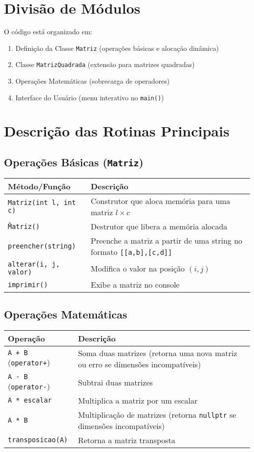 \documentclass{article}
\begin{document}
\section{Divisão de Módulos}
O código está organizado em:
\begin{enumerate}
    \item Definição da Classe \texttt{Matriz} (operações básicas e alocação dinâmica)
    \item Classe \texttt{MatrizQuadrada} (extensão para matrizes quadradas)
    \item Operações Matemáticas (sobrecarga de operadores)
    \item Interface do Usuário (menu interativo no \texttt{main()})
\end{enumerate}

\section{Descrição das Rotinas Principais}

\subsection{Operações Básicas (\texttt{Matriz})}
\begin{tabular}{|l|p{10cm}|}
\hline
\textbf{Método/Função} & \textbf{Descrição} \\
\hline
\texttt{Matriz(int l, int c)} & Construtor que aloca memória para uma matriz $l \times c$ \\
\hline
\texttt{\~Matriz()} & Destrutor que libera a memória alocada \\
\hline
\texttt{preencher(string)} & Preenche a matriz a partir de uma string no formato \texttt{[[a,b],[c,d]]} \\
\hline
\texttt{alterar(i, j, valor)} & Modifica o valor na posição $(i, j)$ \\
\hline
\texttt{imprimir()} & Exibe a matriz no console \\
\hline
\end{tabular}

\subsection{Operações Matemáticas}
\begin{tabular}{|l|p{10cm}|}
\hline
\textbf{Operação} & \textbf{Descrição} \\
\hline
\texttt{A + B} (\texttt{operator+}) & Soma duas matrizes (retorna uma nova matriz ou erro se dimensões incompatíveis) \\
\hline
\texttt{A - B} (\texttt{operator-}) & Subtrai duas matrizes \\
\hline
\texttt{A * escalar} & Multiplica a matriz por um escalar \\
\hline
\texttt{A * B} & Multiplicação de matrizes (retorna \texttt{nullptr} se dimensões incompatíveis) \\
\hline
\texttt{transposicao(A)} & Retorna a matriz transposta \\
\hline
\end{tabular}
\end{document}

